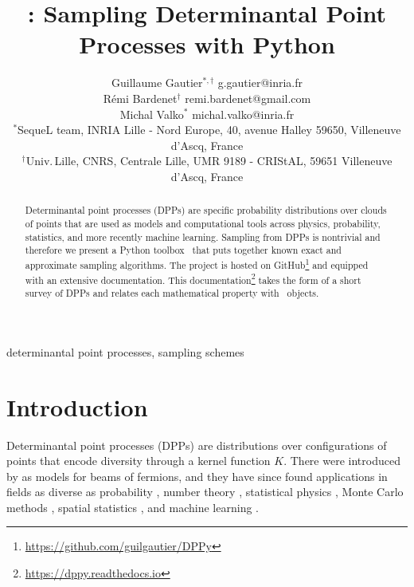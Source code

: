 \documentclass[twoside,11pt]{article}
\begin{document}
\title{\DPPy: Sampling Determinantal Point Processes with Python}

\author{\name Guillaume Gautier$^{*,\dagger}$ \email g.gautier@inria.fr \\
       \name R\'emi Bardenet$^\dagger$ \email remi.bardenet@gmail.com \\
       \name Michal Valko$^*$ \email michal.valko@inria.fr\\
       \addr $^*$SequeL team, INRIA Lille - Nord Europe,  40, avenue Halley 59650, Villeneuve d'Ascq, France\\
       \addr $^\dagger$Univ.\,Lille, CNRS, Centrale Lille, UMR 9189 - CRIStAL, 59651 Villeneuve d'Ascq, France
}

\editor{}

\maketitle

\setcounter{footnote}{3}
\begin{abstract}%
  Determinantal point processes (DPPs) are specific probability distributions over clouds of points that are used as models and computational tools across physics, probability, statistics, and more recently machine learning. Sampling from DPPs is nontrivial and therefore we present a Python toolbox \DPPy\ that puts together known exact and approximate sampling algorithms.
  The project is hosted on GitHub\footnote{\label{fn:github}\url{https://github.com/guilgautier/DPPy}} and equipped with an extensive documentation.
  This documentation\footnote{\label{fn:docs}\url{https://dppy.readthedocs.io}} takes the form of a short survey of DPPs and relates each mathematical property with \DPPy\ objects.
\end{abstract}

\begin{keywords}determinantal point processes, sampling schemes\end{keywords}

\section{Introduction} %
\label{sec:introduction}

  Determinantal point processes (DPPs) are distributions over configurations of points that encode diversity through a kernel function $K$.
  There were introduced by \citet{Mac75} as models for beams of fermions, and they have since found applications in fields as diverse as probability \citep{Sos00, Kon05, HKPV06}, number theory \citep{RuSa96}, statistical physics \citep{PaBe11}, Monte Carlo methods \citep{BaHa16}, spatial statistics \citep{LaMoRu15}, and machine learning \citep{KuTa12}.
\end{document}
